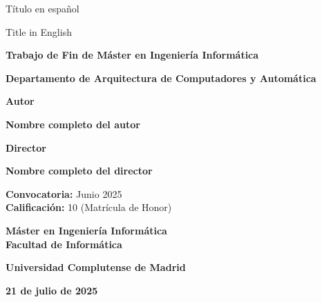 \documentclass[11pt,a4paper]{book}
\begin{document}
\cleardoublepage
\thispagestyle{empty}

\centering
\vspace*{1cm}

{\Huge {Título en español}} \\
{\Huge {Title in English} \par}

\vspace*{2.5cm}

{\large \textbf{Trabajo de Fin de Máster en Ingeniería Informática}} \\
{\large \textbf{Departamento de Arquitectura de Computadores y Automática} \par}

\vspace{1cm}

{\Large \textbf{Autor}} \\
{\large \textbf{Nombre completo del autor} \par}

\vspace{0.50cm}

{\Large \textbf{Director}} \\
{\large \textbf{Nombre completo del director} \par}

\vspace{0.75cm}\vfill

{\large \textbf{Convocatoria:} Junio 2025}\\
{\large \textbf{Calificación:} 10 (Matrícula de Honor)}

\vspace{1.00cm}\vfill

{\large \textbf{Máster en Ingeniería Informática}}\\
{\large \textbf{Facultad de Informática}}\\
{\large \textbf{Universidad Complutense de Madrid} \par}
{\large \textbf{21 de julio de 2025}}
\end{document}
